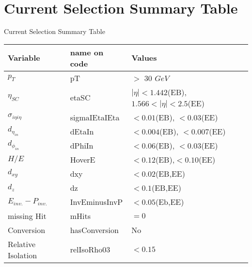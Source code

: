 \documentclass[xcolor=x11names,compress]{beamer}
\renewcommand{\(}{\begin{columns}}
\renewcommand{\)}{\end{columns}}
\newcommand{\<}[1]{\begin{column}{#1}}
\renewcommand{\>}{\end{column}}
\begin{document}
\section{Current Selection Summary Table}
\begin{frame}{Current Selection Summary Table}
  
  \begin{table}
    \begin{center}
      {\footnotesize
        \begin{tabular}{lll}
          Variable & name on code & Values \\
          \hline
          $p_{T}$                & pT            & $>$ 30 $GeV$ \\
          $\eta_{SC}$            & etaSC         & $|\eta|<1.442$(EB), $1.566<|\eta| <2.5$(EE) \\
          $\sigma_{i\eta i\eta}$   & sigmaIEtaIEta & $<0.01$(EB),    $<0.03$(EE) \\
          $d_{\eta_{in}}$          & dEtaIn        & $<0.004$(EB),    $<0.007$(EE) \\
          $d_{\phi_{in}}$         & dPhiIn         & $<0.06$(EB),    $<0.03$(EE) \\
          $H/E$                 & HoverE        & $<0.12$(EB),$<0.10$(EE)\\
          $d_{xy}$               & dxy           & $<0.02$(EB,EE) \\
          $d_{z}$               & dz             & $<0.1$(EB,EE) \\
          $E_{inv.} - P_{inv.}$   & InvEminusInvP  & $<0.05$(Eb,EE)\\
          missing Hit          & mHits          & $=0$ \\
          Conversion           & hasConversion  & No \\
          Relative Isolation   & relIsoRho03    & $<0.15$ \\
        \end{tabular}
      }
    \end{center}
  \end{table}
  
  

\end{frame}
\end{document}
